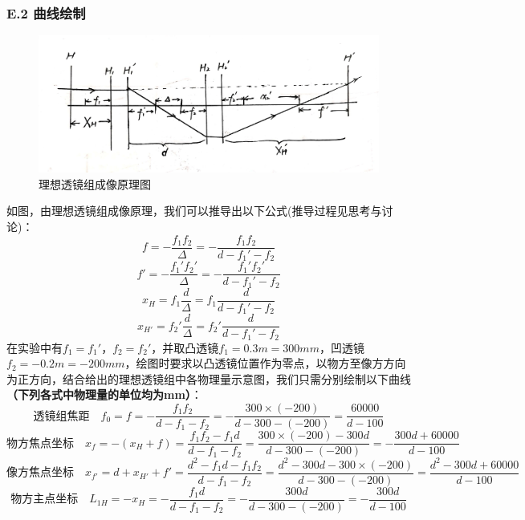 \documentclass[UTF8]{ctexart}
\begin{document}
\subsubsection*{E.2 曲线绘制}
\begin{figure}[H]
    \begin{center}
    \includegraphics[scale=0.17]{3.jpg}\vspace{0em}
    \caption{理想透镜组成像原理图}
    \end{center}
\end{figure}
如图，由理想透镜组成像原理，我们可以推导出以下公式(推导过程见思考与讨论)：
\begin{equation}
    f=-\frac{f_1f_2}{\Delta}=-\frac{f_1f_2}{d-f_1'-f_2}
\end{equation}
\begin{equation}
    f'=-\frac{f_1'f_2'}{\Delta}=-\frac{f_1'f_2'}{d-f_1'-f_2}
\end{equation}
\begin{equation}
    x_H=f_1\frac{d}{\Delta}=f_1\frac{d}{d-f_1'-f_2}
\end{equation}
\begin{equation}
    x_{H'}=f_2'\frac{d}{\Delta}=f_2'\frac{d}{d-f_1'-f_2}
\end{equation}
在实验中有$f_1=f_1'$，$f_2=f_2'$，并取凸透镜$f_1=0.3m=300mm$，凹透镜$f_2=-0.2m=-200mm$，绘图时要求以凸透镜位置作为零点，以物方至像方方向为正方向，结合给出的理想透镜组中各物理量示意图，我们只需分别绘制以下曲线\textbf{（下列各式中物理量的单位均为mm）}：
\[\text{透镜组焦距}\quad f_0=f=-\frac{f_1f_2}{d-f_1-f_2}=-\frac{300\times (-200)}{d-300-(-200)}=\frac{60000}{d-100}\]
\[\text{物方焦点坐标}\quad x_{f}=-(x_H+f)=\frac{f_1f_2-f_1d}{d-f_1-f_2}=\frac{300\times (-200)-300d}{d-300-(-200)}=-\frac{300d+60000}{d-100}\]
\[\text{像方焦点坐标}\quad x_{f'}=d+x_{H'}+f'=\frac{d^2-f_1d-f_1f_2}{d-f_1-f_2}=\frac{d^2-300d-300\times (-200)}{d-300-(-200)}=\frac{d^2-300d+60000}{d-100}\]
\[\text{物方主点坐标}\quad L_{1H}=-x_H=-\frac{f_1d}{d-f_1-f_2}=-\frac{300d}{d-300-(-200)}=-\frac{300d}{d-100}\]
\end{document}
